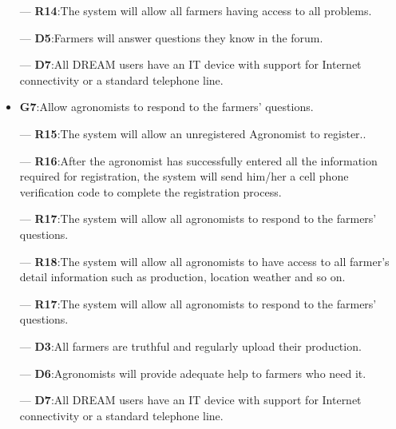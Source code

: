 \documentclass[../../main.tex]{subfiles}
\begin{document}
\begin{itemize}
		    ---\textbf{ R14}:The system will allow all farmers having access to all problems.
		    
		    ---\textbf{ D5}:Farmers will answer questions they know in the forum.
		    
		    ---\textbf{ D7}:All DREAM users have an IT device with support for Internet connectivity or a standard telephone line.
		
		
		\item \textbf{G7}:Allow agronomists to respond to the farmers’ questions.
		    
		    ---\textbf{ R15}:The system will allow an unregistered Agronomist to register..
		    
		    ---\textbf{ R16}:After the agronomist has successfully entered all the information required for registration, the system will send him/her a cell phone verification code to complete the registration process.
		    
		    ---\textbf{ R17}:The system will allow all agronomists to respond to the farmers’ questions.
		    
		     ---\textbf{ R18}:The system will allow all agronomists to have access to all farmer's detail information such as production, location weather and so on.
		     
		      ---\textbf{ R17}:The system will allow all agronomists to respond to the farmers’ questions.
		    
		    ---\textbf{ D3}:All farmers are truthful and regularly upload their production.
		    
		    ---\textbf{ D6}:Agronomists will provide adequate help to farmers who need it.
		    
		    ---\textbf{ D7}:All DREAM users have an IT device with support for Internet connectivity or a standard telephone line.

\end{itemize}
\end{document}
